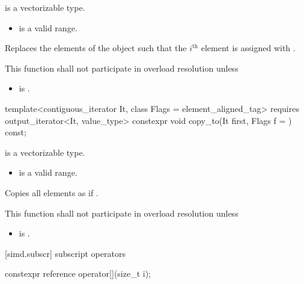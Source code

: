 \begin{itemdescr}
  \pnum\constraints
   is a vectorizable type.

  \pnum\requires
  \begin{itemize}
    \item \tcode{[mem, mem + size())} is a valid range.
  \end{itemize}

  \pnum\effects
  Replaces the elements of the  object such that the $i^\text{th}$ element is assigned with  \foralli.

  \pnum\remarks
  This function shall not participate in overload resolution unless
  \begin{itemize}
    \item {} is .
  \end{itemize}
\end{itemdescr}

\begin{itemdecl}
template<contiguous_iterator It, class Flags = element_aligned_tag>
  requires output_iterator<It, value_type>
  constexpr void copy_to(It first, Flags f = {}) const;
\end{itemdecl}

\begin{itemdescr}
  \pnum\constraints
   is a vectorizable type.

  \pnum\requires
  \begin{itemize}
    \item \tcode{[mem, mem + size())} is a valid range.
  \end{itemize}

  \pnum\effects
  Copies all  elements as if  \foralli.

  \pnum\remarks
  This function shall not participate in overload resolution unless
  \begin{itemize}
    \item {} is .
  \end{itemize}
\end{itemdescr}

[simd.subscr]{ subscript operators}

\begin{itemdecl}
constexpr reference operator[](size_t i);
\end{itemdecl}

